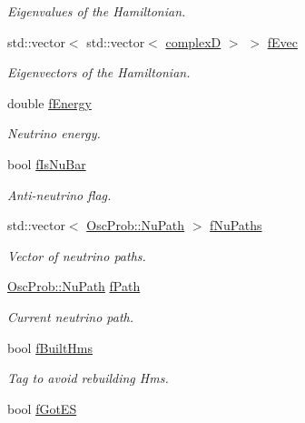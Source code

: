 \begin{DoxyCompactItemize}
\begin{DoxyCompactList}\small\item\em Eigenvalues of the Hamiltonian. \end{DoxyCompactList}\item 
std\+::vector$<$ std\+::vector$<$ \hyperlink{EigenPoint_8h_a67ca8e107e20610c3fff78d5e726ece0}{complexD} $>$ $>$ \hyperlink{classOscProb_1_1PMNS__Base_a87be137356c5f27ab83cab5e1298ef8f}{f\+Evec}
\begin{DoxyCompactList}\small\item\em Eigenvectors of the Hamiltonian. \end{DoxyCompactList}\item 
double \hyperlink{classOscProb_1_1PMNS__Base_a2800af6d436972f3e900867790c046b0}{f\+Energy}
\begin{DoxyCompactList}\small\item\em Neutrino energy. \end{DoxyCompactList}\item 
bool \hyperlink{classOscProb_1_1PMNS__Base_a0ebaeaefab36a3ff381c6293faedfdd6}{f\+Is\+Nu\+Bar}
\begin{DoxyCompactList}\small\item\em Anti-\/neutrino flag. \end{DoxyCompactList}\item 
std\+::vector$<$ \hyperlink{structOscProb_1_1NuPath}{Osc\+Prob\+::\+Nu\+Path} $>$ \hyperlink{classOscProb_1_1PMNS__Base_a69db9d57e12fc7cbe0431bc6c18fac93}{f\+Nu\+Paths}
\begin{DoxyCompactList}\small\item\em Vector of neutrino paths. \end{DoxyCompactList}\item 
\hyperlink{structOscProb_1_1NuPath}{Osc\+Prob\+::\+Nu\+Path} \hyperlink{classOscProb_1_1PMNS__Base_a849437aa8891fe042e86886ce8f81c6e}{f\+Path}
\begin{DoxyCompactList}\small\item\em Current neutrino path. \end{DoxyCompactList}\item 
bool \hyperlink{classOscProb_1_1PMNS__Base_a9ac3cadeac8db1b90f3152f476244780}{f\+Built\+Hms}
\begin{DoxyCompactList}\small\item\em Tag to avoid rebuilding Hms. \end{DoxyCompactList}\item 
bool \hyperlink{classOscProb_1_1PMNS__Base_a6dc5cd010d2d70b2324745b4e53e9839}{f\+Got\+ES}

\end{DoxyCompactItemize}
